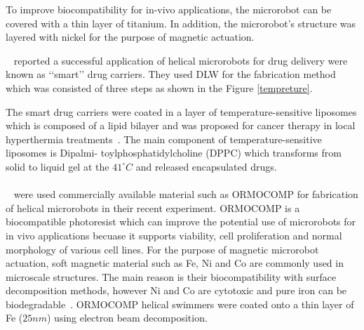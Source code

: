 \documentclass[12pt,a4paper,titlepage]{report}
\begin{document}
To improve biocompatibility for in-vivo applications, the 
microrobot can be covered with a thin layer of titanium. In addition, the microrobot\rq{}s structure was layered with 
nickel for the purpose of magnetic actuation.

\citeauthor{qiu2014artificial}~\citep{qiu2014artificial} reported a successful application of helical microrobots
for drug delivery were known as \lq\lq{}smart\rq\rq{} drug carriers. They used DLW for the fabrication method which 
was consisted of three steps as shown in the Figure \ref{tempreture}. 



The smart drug carriers were coated in a layer of temperature-sensitive liposomes which is composed 
of a lipid bilayer and was proposed for cancer therapy in local hyperthermia treatments~\citep{qiu2014artificial}.
The main component of temperature-sensitive liposomes is Dipalmi- toylphosphatidylcholine (DPPC) which
transforms from solid to liquid gel at the $41^{\circ} C$ and released encapsulated drugs.

\paragraph{}
 \citeauthor{qiu2014noncytotoxic}~\citep{qiu2014noncytotoxic} were used commercially available material such as ORMOCOMP
 for fabrication of helical microrobots in their recent experiment. ORMOCOMP is a biocompatible photoresist which
can improve the potential use of microrobots for in vivo applications becuase it supports viability, cell proliferation
 and normal morphology of various cell lines. For the purpose of magnetic microrobot actuation, soft magnetic material
such as Fe, Ni and Co are commonly used in microscale structures. The main reason is their biocompatibility
with surface decomposition methods, however Ni and Co are cytotoxic and pure iron can be biodegradable~\citep{qiu2014noncytotoxic}.
ORMOCOMP helical swimmers were coated onto a thin layer of Fe ($25 nm$) using electron beam decomposition.
  
\end{document}
